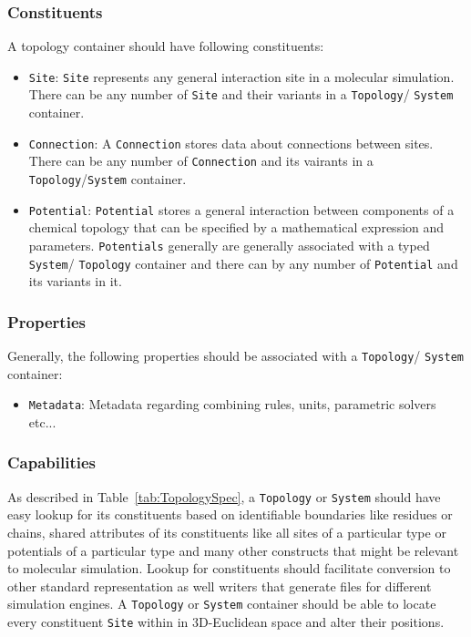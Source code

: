 \documentclass[12pt]{article}
\begin{document}
\subsubsection{Constituents}
A topology container should have following constituents:
\begin{itemize}
    \item \texttt{Site}: \texttt{Site} represents any general interaction site in a molecular simulation. There can be any number of \texttt{Site} and their variants in a \texttt{Topology}/ \texttt{System} container.

    \item \texttt{Connection}: A \texttt{Connection} stores data about connections between sites. There can be any number of \texttt{Connection} and its vairants in a \texttt{Topology}/\texttt{System} container.

    \item \texttt{Potential}: \texttt{Potential} stores a general interaction between components of a chemical topology that can be specified by a mathematical expression and parameters. \texttt{Potentials} generally are generally associated with a typed \texttt{System}/ \texttt{Topology} container and there can by any number of \texttt{Potential} and its variants in it.
\end{itemize}

\subsubsection{Properties}
Generally, the following properties should be associated with a \texttt{Topology}/ \texttt{System} container:

\begin{itemize}
    \item \texttt{Metadata}: Metadata regarding combining rules, units, parametric solvers etc...
\end{itemize}

\subsubsection{Capabilities}
As described in Table~\ref{tab:TopologySpec}, a \texttt{Topology} or \texttt{System} should have easy lookup for its constituents based on identifiable boundaries like residues or chains, shared attributes of its constituents like all sites of a particular type or potentials of a particular type and many other constructs that might be relevant to molecular simulation. Lookup for constituents should facilitate conversion to other standard representation as well writers that generate files for different simulation engines. A \texttt{Topology} or \texttt{System} container should be able to locate every constituent \texttt{Site} within in 3D-Euclidean space and alter their positions.
\end{document}

